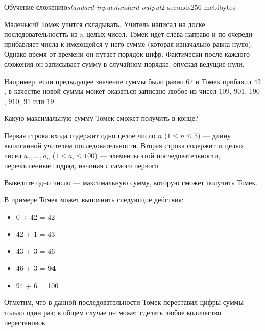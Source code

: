 \begin{problem}{Обучение сложению}{\textsl{standard input}}{\textsl{standard output}}{2 seconds}{256 mebibytes}{}

Маленький Томек учится складывать. Учитель написал на доске последовательностть из $n$ целых чисел. Томек идёт слева направо и по 
очереди прибавляет числа к имеющейся у него сумме (которая изначально равна нулю).
Однако время от времени он путает порядок цифр. Фактически после каждого сложения он записывает сумму в случайном порядке,
опуская ведущие нули.

Например, если предыдущее значение суммы было равно $67$ и Томек прибавил $42$, в качестве новой суммы может оказаться записано
любое из чисел  $109$, $901$, $190$, $910$, $91$ или $19$.

Какую максимальную сумму Томек сможет получить в конце?

\InputFile

Первая строка входа содержит одно целое число $n$ ($1 \leq n \leq 5$) --- длину выписанной учителем последовательности.
Вторая строка содержит $n$ целых чисел $a_1, \ldots, a_n$ ($1 \leq a_i \leq 100$) --- элементы этой последовательности, перечисленные подряд,
начиная с самого первого.

\OutputFile

Выведите одно число --- максимальную сумму, которую сможет получить Томек.

\Examples
\begin{example}
%
\end{example}

\Note

В примере Томек может выполнить следующие действия:
    \begin{itemize}
        \item 0 + 42 = 42
        \item 42 + 1 = 43
        \item 43 + 3 = 46
        \item 46 + 3 = \textbf{94}
        \item 94 + 6 = 100
    \end{itemize}
Отметим, что в данной последовательности Томек переставил цифры суммы только один раз; в общем случае он может сделать любое количество перестановок.

\end{problem}
